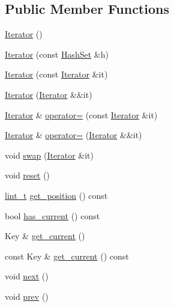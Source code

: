 \subsection*{Public Member Functions}
\begin{DoxyCompactItemize}
\item 
\hyperlink{class_designar_1_1_hash_set_1_1_iterator_a35f9b2ac54be788fa6c2b8a274c7e308}{Iterator} ()
\item 
\hyperlink{class_designar_1_1_hash_set_1_1_iterator_a1047f02ec4c3bfd5919ef66b28ca537c}{Iterator} (const \hyperlink{class_designar_1_1_hash_set}{Hash\+Set} \&h)
\item 
\hyperlink{class_designar_1_1_hash_set_1_1_iterator_addcd6728c590ea206dd13d9f0724bbcd}{Iterator} (const \hyperlink{class_designar_1_1_hash_set_1_1_iterator}{Iterator} \&it)
\item 
\hyperlink{class_designar_1_1_hash_set_1_1_iterator_a7adf1abf361e03423317b2e36eb76f1f}{Iterator} (\hyperlink{class_designar_1_1_hash_set_1_1_iterator}{Iterator} \&\&it)
\item 
\hyperlink{class_designar_1_1_hash_set_1_1_iterator}{Iterator} \& \hyperlink{class_designar_1_1_hash_set_1_1_iterator_a8e8fce4e60beb6933dd5d13b39d67493}{operator=} (const \hyperlink{class_designar_1_1_hash_set_1_1_iterator}{Iterator} \&it)
\item 
\hyperlink{class_designar_1_1_hash_set_1_1_iterator}{Iterator} \& \hyperlink{class_designar_1_1_hash_set_1_1_iterator_a5856c1a7f46a0c4e2899acff687fdf13}{operator=} (\hyperlink{class_designar_1_1_hash_set_1_1_iterator}{Iterator} \&\&it)
\item 
void \hyperlink{class_designar_1_1_hash_set_1_1_iterator_a5849b111320c33206baef1926cb3f156}{swap} (\hyperlink{class_designar_1_1_hash_set_1_1_iterator}{Iterator} \&it)
\item 
void \hyperlink{class_designar_1_1_hash_set_1_1_iterator_a4563f0da2eaf8dc2b4879cc959f7c277}{reset} ()
\item 
\hyperlink{namespace_designar_a9d113d66a39e82b73727c72cd3a52f73}{lint\+\_\+t} \hyperlink{class_designar_1_1_hash_set_1_1_iterator_a12b236661945aa10228f0523b6e1ab5e}{get\+\_\+position} () const
\item 
bool \hyperlink{class_designar_1_1_hash_set_1_1_iterator_a13dc6ab67d6d4a380e2f1cb4fd6d3ae2}{has\+\_\+current} () const
\item 
Key \& \hyperlink{class_designar_1_1_hash_set_1_1_iterator_af954a7cf3f23fecf898b86030e808224}{get\+\_\+current} ()
\item 
const Key \& \hyperlink{class_designar_1_1_hash_set_1_1_iterator_aed6b09996733067a2aa5e48b702ba9a2}{get\+\_\+current} () const
\item 
void \hyperlink{class_designar_1_1_hash_set_1_1_iterator_a13eaec913faa009d4d002c25965d67d7}{next} ()
\item 
void \hyperlink{class_designar_1_1_hash_set_1_1_iterator_a678b8d6f21627b05cbde7d11da64a010}{prev} ()
\end{DoxyCompactItemize}

